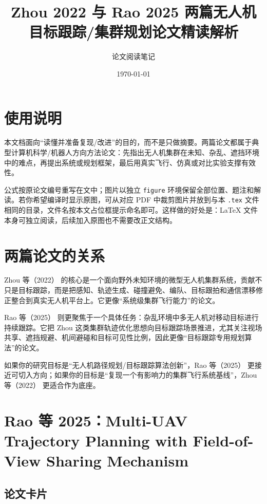 ﻿\documentclass[UTF8,a4paper,11pt]{ctexart}
\title{Zhou 2022 与 Rao 2025 两篇无人机目标跟踪/集群规划论文精读解析}
\author{论文阅读笔记}
\date{\today}
\newcommand{\Rao}{Rao 等（2025）}
\newcommand{\Zhou}{Zhou 等（2022）}
\begin{document}
\maketitle
\tableofcontents
\newpage

\section{使用说明}

本文档面向“读懂并准备复现/改进”的目的，而不是只做摘要。两篇论文都属于典型计算机科学/机器人方向方法论文：先指出无人机集群在未知、杂乱、遮挡环境中的难点，再提出系统或规划框架，最后用真实飞行、仿真或对比实验支撑有效性。

公式按原论文编号重写在文中；图片以独立 \texttt{figure} 环境保留全部位置、题注和解读。若你希望编译时显示原图，可从对应 PDF 中裁剪图片并放到与本 \texttt{.tex} 文件相同的目录，文件名按本文占位框提示命名即可。这样做的好处是：LaTeX 文件本身可独立阅读，后续加入原图也不需要改正文结构。

\section{两篇论文的关系}

\Zhou{} 的核心是一个面向野外未知环境的微型无人机集群系统，贡献不只是目标跟踪，而是把感知、轨迹生成、碰撞避免、编队、目标跟拍和通信漂移修正整合到真实无人机平台上。它更像“系统级集群飞行能力”的论文。

\Rao{} 则更聚焦于一个具体任务：杂乱环境中多无人机对移动目标进行持续跟踪。它把 Zhou 这类集群轨迹优化思想向目标跟踪场景推进，尤其关注视场共享、遮挡规避、机间避碰和目标可见性比例，因此更像“目标跟踪专用规划算法”的论文。

如果你的研究目标是“无人机路径规划/目标跟踪算法创新”，\Rao{} 更接近可切入方向；如果你的目标是“复现一个有影响力的集群飞行系统基线”，\Zhou{} 更适合作为底座。

\section{Rao 等 2025：Multi-UAV Trajectory Planning with Field-of-View Sharing Mechanism}

\subsection{论文卡片}
\end{document}
